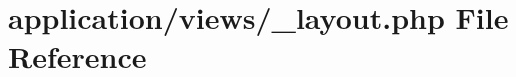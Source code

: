 \hypertarget{__layout_8php}{\section{application/views/\-\_\-layout.php File Reference}
\label{__layout_8php}
}
